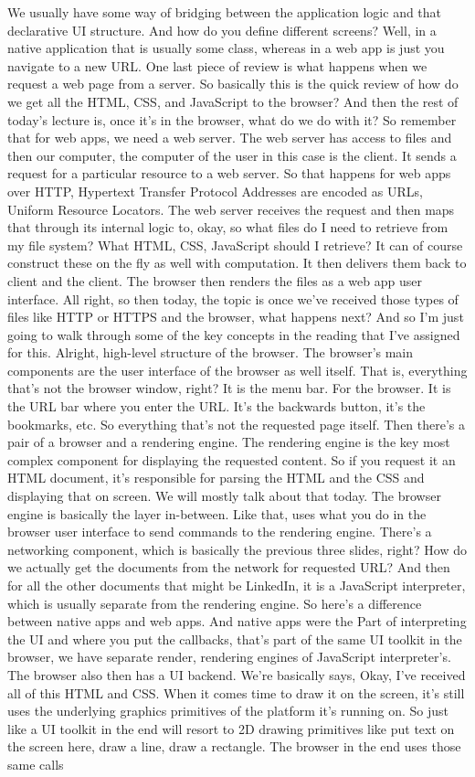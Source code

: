 We usually have some way of bridging between the application logic and that declarative UI structure. And how do you define different screens? Well, in a native application that is usually some class, whereas in a web app is just you navigate to a new URL. One last piece of review is what happens when we request a web page from a server. So basically this is the quick review of how do we get all the HTML, CSS, and JavaScript to the browser? And then the rest of today's lecture is, once it's in the browser, what do we do with it? So remember that for web apps, we need a web server. The web server has access to files and then our computer, the computer of the user in this case is the client. It sends a request for a particular resource to a web server. So that happens for web apps over HTTP, Hypertext Transfer Protocol Addresses are encoded as URLs, Uniform Resource Locators. The web server receives the request and then maps that through its internal logic to, okay, so what files do I need to retrieve from my file system? What HTML, CSS, JavaScript should I retrieve? It can of course construct these on the fly as well with computation. It then delivers them back to client and the client. The browser then renders the files as a web app user interface. All right, so then today, the topic is once we've received those types of files like HTTP or HTTPS and the browser, what happens next? And so I'm just going to walk through some of the key concepts in the reading that I've assigned for this. Alright, high-level structure of the browser. The browser's main components are the user interface of the browser as well itself. That is, everything that's not the browser window, right? It is the menu bar. For the browser. It is the URL bar where you enter the URL. It's the backwards button, it's the bookmarks, etc. So everything that's not the requested page itself. Then there's a pair of a browser and a rendering engine. The rendering engine is the key most complex component for displaying the requested content. So if you request it an HTML document, it's responsible for parsing the HTML and the CSS and displaying that on screen. We will mostly talk about that today. The browser engine is basically the layer in-between. Like that, uses what you do in the browser user interface to send commands to the rendering engine. There's a networking component, which is basically the previous three slides, right? How do we actually get the documents from the network for requested URL? And then for all the other documents that might be LinkedIn, it is a JavaScript interpreter, which is usually separate from the rendering engine. So here's a difference between native apps and web apps. And native apps were the Part of interpreting the UI and where you put the callbacks, that's part of the same UI toolkit in the browser, we have separate render, rendering engines of JavaScript interpreter's. The browser also then has a UI backend. We're basically says, Okay, I've received all of this HTML and CSS. When it comes time to draw it on the screen, it's still uses the underlying graphics primitives of the platform it's running on. So just like a UI toolkit in the end will resort to 2D drawing primitives like put text on the screen here, draw a line, draw a rectangle. The browser in the end uses those same calls 